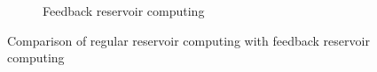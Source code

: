 \begin{figure}[htbp]
\begin{subfigure}[t]{.45\linewidth}
    \caption{Feedback reservoir computing}
    \label{fig:feedback_reservoir}
  \end{subfigure}
  \caption{Comparison of regular reservoir computing with feedback reservoir computing}
  \label{"waiting for reftex-label call..."}
\end{figure}
